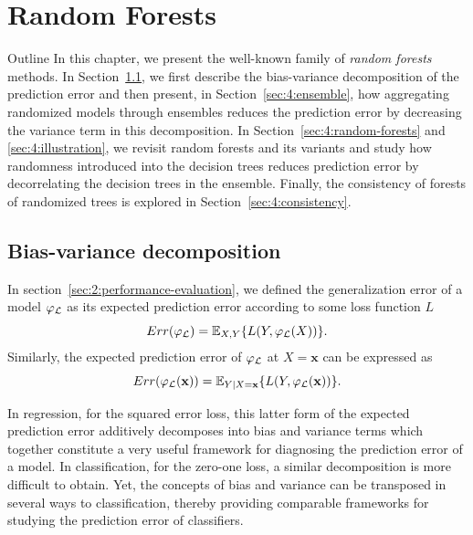\chapter{Random Forests}\label{ch:forest}

\begin{remark}{Outline}
In this chapter, we present the well-known family of \textit{random forests}
methods. In Section~\ref{sec:4:bias-variance}, we first describe the bias-variance
decomposition of the prediction error and then present, in
Section~\ref{sec:4:ensemble}, how aggregating randomized models through
ensembles reduces the prediction error by decreasing the variance term in this
decomposition. In Section~\ref{sec:4:random-forests} and \ref{sec:4:illustration}, we revisit random forests
and its variants and study how randomness introduced into the decision trees
reduces prediction error by decorrelating the decision
trees in the ensemble. Finally, the consistency of forests of randomized trees
is explored in Section~\ref{sec:4:consistency}.
\end{remark}


\section{Bias-variance decomposition}
\label{sec:4:bias-variance}

In section~\ref{sec:2:performance-evaluation}, we defined the generalization
error of a model $\varphi_{\cal L}$ as its expected prediction error
according to some loss function $L$
\begin{equation}
Err(\varphi_{\cal L}) = \mathbb{E}_{X,Y} \{ L(Y, \varphi_{\cal L}(X)) \}.
\end{equation}
Similarly, the expected prediction error of $\varphi_{\cal L}$ at $X=\mathbf{x}$
can be expressed as
\begin{equation}
Err(\varphi_{\cal L}(\mathbf{x})) = \mathbb{E}_{Y|X=\mathbf{x}} \{ L(Y, \varphi_{\cal L}(\mathbf{x})) \}.\label{eqn:4:generalization-error:x}
\end{equation}

In regression, for the squared error loss, this latter form of the expected
prediction error additively decomposes into bias and variance terms which
together constitute a very useful framework for diagnosing the prediction error
of a model. In classification, for the zero-one loss, a similar decomposition
is more difficult to obtain. Yet, the concepts of bias and variance can be
transposed in several ways to classification, thereby providing comparable
frameworks for studying the prediction error of classifiers.


